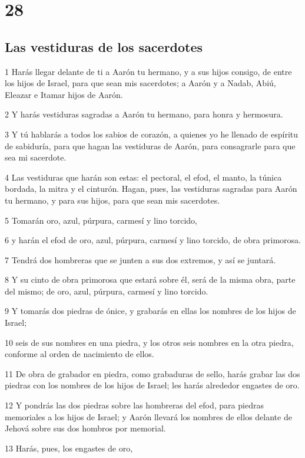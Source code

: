 \chapter{28}

\section*{Las vestiduras de los sacerdotes}

\par 1 Harás llegar delante de ti a Aarón tu hermano, y a sus hijos consigo, de entre los hijos de Israel, para que sean mis sacerdotes; a Aarón y a Nadab, Abiú, Eleazar e Itamar hijos de Aarón.
\par 2 Y harás vestiduras sagradas a Aarón tu hermano, para honra y hermosura.
\par 3 Y tú hablarás a todos los sabios de corazón, a quienes yo he llenado de espíritu de sabiduría, para que hagan las vestiduras de Aarón, para consagrarle para que sea mi sacerdote.
\par 4 Las vestiduras que harán son estas: el pectoral, el efod, el manto, la túnica bordada, la mitra y el cinturón. Hagan, pues, las vestiduras sagradas para Aarón tu hermano, y para sus hijos, para que sean mis sacerdotes.
\par 5 Tomarán oro, azul, púrpura, carmesí y lino torcido,
\par 6 y harán el efod de oro, azul, púrpura, carmesí y lino torcido, de obra primorosa.
\par 7 Tendrá dos hombreras que se junten a sus dos extremos, y así se juntará.
\par 8 Y su cinto de obra primorosa que estará sobre él, será de la misma obra, parte del mismo; de oro, azul, púrpura, carmesí y lino torcido.
\par 9 Y tomarás dos piedras de ónice, y grabarás en ellas los nombres de los hijos de Israel;
\par 10 seis de sus nombres en una piedra, y los otros seis nombres en la otra piedra, conforme al orden de nacimiento de ellos.
\par 11 De obra de grabador en piedra, como grabaduras de sello, harás grabar las dos piedras con los nombres de los hijos de Israel; les harás alrededor engastes de oro.
\par 12 Y pondrás las dos piedras sobre las hombreras del efod, para piedras memoriales a los hijos de Israel; y Aarón llevará los nombres de ellos delante de Jehová sobre sus dos hombros por memorial.
\par 13 Harás, pues, los engastes de oro,

